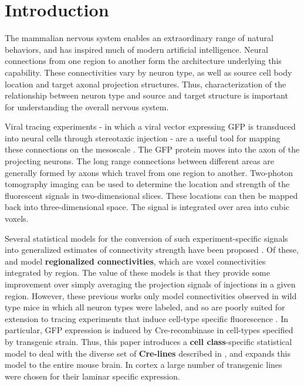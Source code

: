 \section{Introduction}
 
The mammalian nervous system enables an extraordinary range of natural behaviors, and has inspired much of modern artificial intelligence.
Neural connections from one region to another form the architecture underlying this capability.
These connectivities vary by neuron type, as well as source cell body location and target axonal projection structures.
Thus, characterization of the relationship between neuron type and source and target structure is important for understanding the overall nervous system.

Viral tracing experiments - in which a viral vector expressing GFP is transduced into neural cells through stereotaxic injection - are a useful tool for mapping these connections on the mesoscale \citep{Chamberlin1998-hi,Harris2012-fw, Daigle2018-gd}.
The GFP protein moves into the axon of the projecting neurons. The long range connections between different areas are generally formed by axons which travel from one region to another. 
Two-photon tomography imaging can be used to determine the location and strength of the fluorescent signals in two-dimensional slices.
These locations can then be mapped back into three-dimensional space.
The signal is integrated over area into cubic voxels.

Several statistical models for the conversion of such experiment-specific signals into generalized estimates of connectivity strength have been proposed \citep{Oh2014-kh, Harris2016-fn, Gamanut2018-sd, Knox2019-ot}.
Of these, \citet{Oh2014-kh} and \citet{Knox2019-ot} model \textbf{regionalized connectivities}, which are voxel connectivities integrated by region.
The value of these models is that they provide some improvement over simply averaging the projection signals of injections in a given region.
However, these previous works only model connectivities observed in wild type mice in which all neuron types were labeled, and so are poorly suited for extension to tracing experiments that induce cell-type specific fluorescence \citep{Harris2019-mr}.
In particular, GFP expression is induced by Cre-recombinase in cell-types specified by transgenic strain.
Thus, this paper introduces a \textbf{cell class}-specific statistical model to deal with the diverse set of \textbf{Cre-lines} described in \citet{Harris2019-mr}, and expands this model to the entire mouse brain. In cortex a large number of transgenic lines were chosen for their laminar specific expression.

